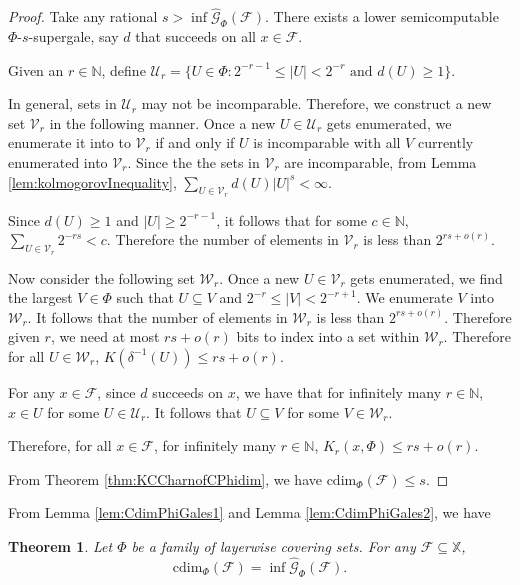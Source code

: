\documentclass[11pt]{article}
\newtheorem{theorem}{Theorem}
\newcommand{\N}{\mathbb{N}}
\newcommand{\cdim}{\mathrm{cdim}}
\newcommand{\F}{{\mathcal{F}}}
\newcommand{\X}{{\mathbb{X}}}
\renewcommand{\F}{\mathcal{F}}
\newcommand{\U}{U}
\begin{document}
\begin{proof} 
	Take any rational $s > \inf \hat{\mathcal{G}}_{\Phi}(\mathcal{F})$. There exists a lower semicomputable $\Phi$-$s$-supergale, say ${d}$ that succeeds on all $x \in \F$.
	
	Given an $r \in \N$, define 
	$\mathcal{U}_r = \{\U \in \Phi : 2^{-r-1} \leq |U| < 2^{-r} \text{ and } d(U) \geq 1\}.$
	
	In general, sets in $\mathcal{U}_r$ may not be incomparable. Therefore, we construct a new set $\mathcal{V}_r$ in the following manner. Once a new $U \in \mathcal{U}_r$ gets enumerated, we enumerate it into to $\mathcal{V}_r$ if and only if $U$ is incomparable with all $V$ currently enumerated into $\mathcal{V}_r$.
	Since the the sets in $\mathcal{V}_r$ are incomparable, from Lemma \ref{lem:kolmogorovInequality},  $\sum_{U \in \mathcal{V}_r} d(U) |U|^s < \infty$.
	
	Since $d(U) \geq 1$ and $|U| \geq 2^{-r-1}$, it follows that for some $c \in \N$, $\sum_{U \in \mathcal{V}_r} 2^{-rs} < c$. Therefore the number of elements in $\mathcal{V}_r$ is less than $2^{rs + o(r)}$.  
	
	Now consider the following set $\mathcal{W}_r$. Once a new $U \in \mathcal{V}_r$ gets enumerated, we find the largest $V \in \Phi$ such that $U \subseteq V$ and $2^{-r} \leq |V| < 2^{-r+1}$. We enumerate $V$ into $\mathcal{W}_r$. It follows that  the number of elements in $\mathcal{W}_r$ is less than $2^{rs + o(r)}$. Therefore given $r$, we need at most $rs+o(r)$ bits to index into a set within $\mathcal{W}_r$.	
	Therefore for all $U \in  \mathcal{W}_r$, $K(\delta^{-1}(U)) \leq rs + o(r)$.
	
	For any $x \in \F$, since ${d}$ succeeds on $x$, we have that for infinitely many $r \in \N$, $x \in U$ for some $U \in \mathcal{U}_r$. It follows that $U \subseteq V$ for some $V \in \mathcal{W}_r$.
	
	Therefore, for all $x \in \F$, for infinitely many $r \in \N$, $K_r(x, \Phi) \leq rs +o(r)$. 
	
	From Theorem \ref{thm:KCCharnofCPhidim}, we have $\cdim_{\Phi}(\F) \leq s$.
\end{proof}

From Lemma \ref{lem:CdimPhiGales1} and Lemma \ref{lem:CdimPhiGales2}, we have

\begin{theorem} \label{thm:CdimPhiGales}
	Let $\Phi$ be a family of layerwise covering sets. For any  $\mathcal{F}
	\subseteq \X$, $$\cdim_{\Phi}(\mathcal{F}) = \inf
	\hat{\mathcal{G}}_{\Phi}(\mathcal{F}).$$
\end{theorem}
\end{document}
